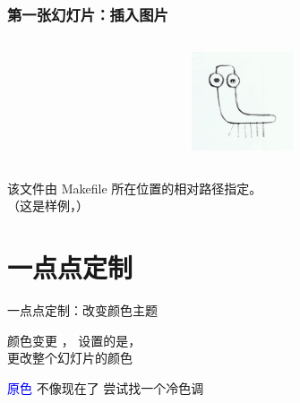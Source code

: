 \begin{frame}[fragile]
  \frametitle{第一张幻灯片：插入图片}
  \begin{columns}
    \begin{column}{0.67\textwidth}
      
    \end{column}
    \begin{column}{0.33\textwidth}
      \includegraphics[width = 3cm]{./fig/logo}
    \end{column}
  \end{columns}
    该文件由 Makefile 所在位置的相对路径指定。\\
    （这是样例，\hbox{}）  
\end{frame}

\section{一点点定制}

{

\begin{frame}{一点点定制：改变颜色主题}
  \begin{block}{颜色变更}
    ， 设置的是，\\
    更改整个幻灯片的颜色
    
    \begin{itemize}
      \ngitem \textcolor{blue}{原色} 不像现在了
      \okitem 尝试找一个冷色调
    \end{itemize}
  \end{block}

\end{frame}
}

